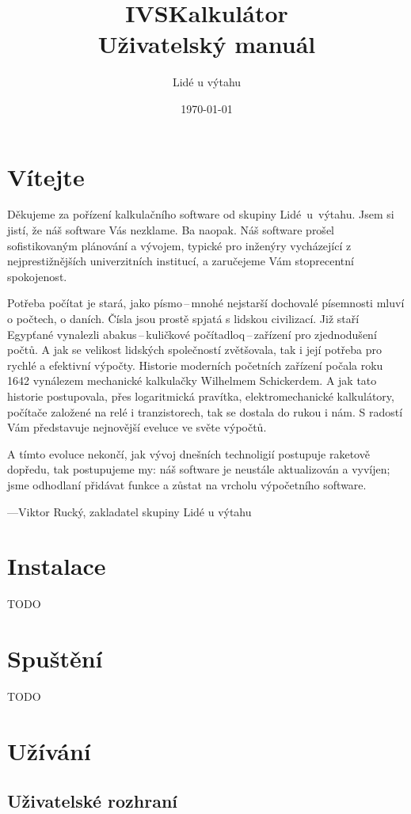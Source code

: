 \documentclass[a5paper,8pt]{article}
\title{IVSKalkulátor\\Uživatelský manuál}
\author{Lidé u výtahu}
\date{\today}
\begin{document}
    \setlength{\parindent}{0em}
    \setlength{\parskip}{1em}
    \maketitle
    
    \newpage

    \section*{Vítejte}
    Děkujeme za pořízení kalkulačního software od skupiny Lidé~u~výtahu. Jsem si jistí, že náš software Vás nezklame. Ba naopak. Náš software prošel sofistikovaným plánování a vývojem, typické pro inženýry vycházející z nejprestižnějších univerzitních institucí, a zaručejeme Vám stoprecentní spokojenost.

    Potřeba počítat je stará, jako písmo\,--\,mnohé nejstarší dochovalé písemnosti mluví o počtech, o daních. Čísla jsou prostě spjatá s lidskou civilizací. Již staří Egypťané vynalezli abakus\,--\,kuličkové počítadloq\,--\,zařízení pro zjednodušení počtů. A jak se velikost lidských společností zvětšovala, tak i její potřeba pro rychlé a efektivní výpočty. Historie moderních početních zařízení počala roku 1642 vynálezem mechanické kalkulačky Wilhelmem Schickerdem. A jak tato historie postupovala, přes logaritmická pravítka, elektromechanické kalkulátory, počítače založené na relé i tranzistorech, tak se dostala do rukou i nám. S radostí Vám představuje nejnovější eveluce ve světe výpočtů.

    A tímto evoluce nekončí, jak vývoj dnešních technoligií postupuje raketově dopředu, tak postupujeme my: náš software je neustále aktualizován a vyvíjen; jsme odhodlaní přidávat funkce a zůstat na vrcholu výpočetního software.
    
    ---Viktor Rucký, zakladatel skupiny Lidé u výtahu
    \newpage
    \section{Instalace}
    TODO
    \section{Spuštění}
    TODO
    \section{Užívání}
    \subsection{Uživatelské rozhraní}
\end{document}

